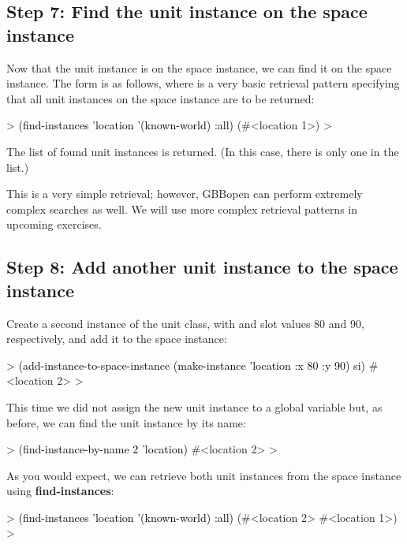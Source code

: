 \documentclass[10pt,twoside,english,pdftex]{article}
\begin{document}
\subsection*{Step 7: Find the unit instance on the space instance}

%
%
Now that the  unit instance is on the  space
instance, we can find it on the space instance. The form is as follows,
where  is a very basic retrieval pattern specifying that all unit
instances on the  space instance are to be returned:
%
\begin{example}\color{darkergray}%
  > \textcolor{black}{(find-instances 'location '(known-world) :all)}
  (#<location 1>)
  >
\end{example}

The list of found unit instances is returned. (In this case, there is only one
in the list.)

This is a very simple retrieval; however, GBBopen can perform extremely
complex searches as well.  We will use more complex retrieval patterns in
upcoming exercises.

\subsection*{Step 8: Add another unit instance to the space instance}

%
%
Create a second instance of the  unit class, with  and
 slot values 80 and 90, respectively, and add it to the
 space instance:
%
\begin{example}\color{darkergray}%
  > \textcolor{black}{(add-instance-to-space-instance 
       (make-instance 'location :x 80 :y 90)
       si)}
  #<location 2>
  >
\end{example}

%
This time we did not assign the new  unit instance to a global
variable but, as before, we can find the unit instance by its name:
%
\begin{example}\color{darkergray}%
  > \textcolor{black}{(find-instance-by-name 2 'location)}
  #<location 2>
  >
\end{example}

%
%
As you would expect, we can retrieve both  unit instances from the
 space instance using \textbf{find-instances}:
%
\begin{example}\color{darkergray}%
  > \textcolor{black}{(find-instances 'location '(known-world) :all)}
  (#<location 2> #<location 1>)
  >
\end{example}
\end{document}
